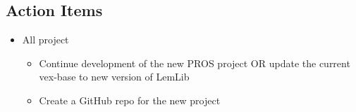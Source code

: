 \subsection{Action Items}
\begin{itemize}
    \item All project
    \begin{itemize}
        \item Continue development of the new PROS project OR update the current vex-base to new version of LemLib
        \item Create a GitHub repo for the new project
    \end{itemize}
\end{itemize}
